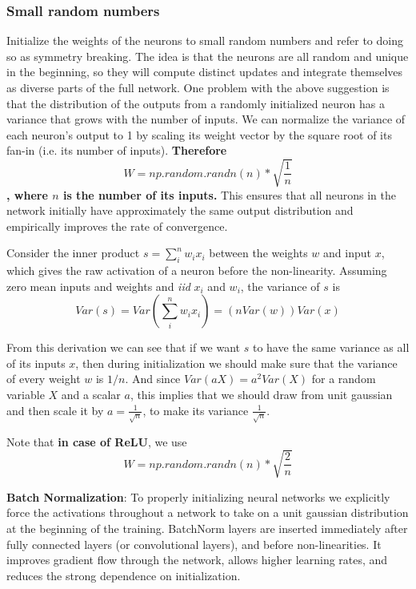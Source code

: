 \documentclass[letterpaper]{article}
\begin{document}
\subsubsection{Small random numbers}

Initialize the weights of the neurons to small random numbers and refer to doing so as symmetry breaking. The idea is that the neurons are all random and unique in the beginning, so they will compute distinct updates and integrate themselves as diverse parts of the full network. One problem with the above suggestion is that the distribution of the outputs from a randomly initialized neuron has a variance that grows with the number of inputs. We can normalize the variance of each neuron’s output to 1 by scaling its weight vector by the square root of its fan-in (i.e. its number of inputs). \textbf{
	Therefore 
	\[W = np.random.randn(n)*\sqrt{\frac{1}{n}}\]
	, where \(n\) is the number of its inputs.
} This ensures that all neurons in the network initially have approximately the same output distribution and empirically improves the rate of convergence. 

Consider the inner product \(s = \sum_{i}^{n} w_ix_i\) between the weights \(w\) and input \(x\), which gives the raw activation of a neuron before the non-linearity. Assuming zero mean inputs and weights and \textit{iid} \(x_i\) and \(w_i\), the variance of \(s\) is 
\[Var(s) = Var(\sum_{i}^{n} w_ix_i) = (nVar(w))Var(x)\]

From this derivation we can see that if we want \(s\) to have the same variance as all of its inputs \(x\), then during initialization we should make sure that the variance of every weight \(w\) is \(1/n\). And since \(Var(aX)=a^2Var(X)\) for a random variable \(X\) and a scalar \(a\), this implies that we should draw from unit gaussian and then scale it by \(a = \frac{1}{\sqrt{n}}\), to make its variance \(\frac{1}{\sqrt{n}}\). 

Note that \textbf{in case of ReLU}, we use \[W = np.random.randn(n)*\sqrt{\frac{2}{n}}\]

\textbf{Batch Normalization}: To properly initializing neural networks we explicitly force the activations throughout a network to take on a unit gaussian distribution at the beginning of the training. BatchNorm layers are inserted immediately after fully connected layers (or convolutional layers), and before non-linearities. It improves gradient flow through the network, allows higher learning rates, and reduces the strong dependence on initialization.
\end{document}

